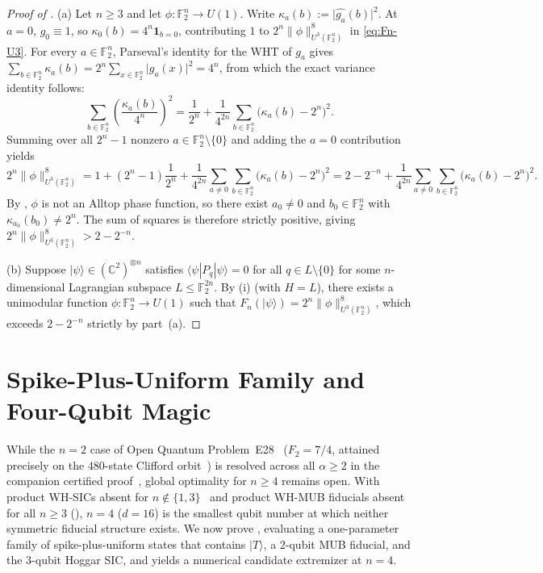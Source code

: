 \documentclass[11pt,a4paper]{article}
\theoremstyle{plain}
\theoremstyle{definition}
\theoremstyle{remark}
\newcommand{\C}{\mathbb{C}}
\newcommand{\F}{\mathbb{F}}
\newcommand{\Uone}{U(1)}
\newcommand{\ket}[1]{|#1\rangle}
\newcommand{\expval}[2]{\langle#1|#2|#1\rangle}
\newcommand{\abs}[1]{\lvert#1\rvert}
\newcommand{\norm}[1]{\lVert#1\rVert}
\newcommand{\indic}[1]{\mathbf{1}_{#1}}
\numberwithin{equation}{section}
\begin{document}
\begin{proof}[Proof of ]
(a) Let $n \ge 3$ and let $\phi : \F_2^n \to \Uone$. Write $\kappa_a(b) := \abs{\widehat{g_a}(b)}^2$. At $a = 0$, $g_0 \equiv 1$, so $\kappa_0(b) = 4^n \indic{b = 0}$, contributing $1$ to $2^n\norm{\phi}_{U^3(\F_2^n)}^8$ in \eqref{eq:Fn-U3}. For every $a \in \F_2^n$, Parseval's identity for the WHT of $g_a$ gives $\sum_{b \in \F_2^n} \kappa_a(b) = 2^n \sum_{x \in \F_2^n} \abs{g_a(x)}^2 = 4^n$, from which the exact variance identity follows:
\[
  \sum_{b \in \F_2^n} \left(\frac{\kappa_a(b)}{4^n}\right)^2
  = \frac{1}{2^n} + \frac{1}{4^{2n}} \sum_{b \in \F_2^n} \bigl(\kappa_a(b) - 2^n\bigr)^2.
\]
Summing over all $2^n - 1$ nonzero $a \in \F_2^n \setminus \{0\}$ and adding the $a = 0$ contribution yields
\[
  2^n \norm{\phi}_{U^3(\F_2^n)}^8
  = 1 + (2^n - 1)\frac{1}{2^n} + \frac{1}{4^{2n}} \sum_{a \neq 0} \sum_{b \in \F_2^n} \bigl(\kappa_a(b) - 2^n\bigr)^2
  = 2 - 2^{-n} + \frac{1}{4^{2n}} \sum_{a \neq 0} \sum_{b \in \F_2^n} \bigl(\kappa_a(b) - 2^n\bigr)^2.
\]
By , $\phi$ is not an Alltop phase function, so there exist $a_0 \neq 0$ and $b_0 \in \F_2^n$ with $\kappa_{a_0}(b_0) \neq 2^n$. The sum of squares is therefore strictly positive, giving $2^n \norm{\phi}_{U^3(\F_2^n)}^8 > 2 - 2^{-n}$.

(b) Suppose $\ket{\psi} \in (\C^2)^{\otimes n}$ satisfies $\expval{\psi}{P_q} = 0$ for all $q \in L \setminus \{0\}$ for some $n$-dimensional Lagrangian subspace $L \le \F_2^{2n}$. By (i) (with $H = L$), there exists a unimodular function $\phi : \F_2^n \to \Uone$ such that $F_n(\ket{\psi}) = 2^n\norm{\phi}_{U^3(\F_2^n)}^8$, which exceeds $2 - 2^{-n}$ strictly by part~(a).
\end{proof}

\section{Spike-Plus-Uniform Family and Four-Qubit Magic}\label{sec:spike}

While the $n = 2$ case of Open Quantum Problem~E28~\cite{oqpE28} ($F_2 = 7/4$, attained precisely on the $480$-state Clifford orbit~\cite{liu2026maximal}) is resolved across all $\alpha \ge 2$ in the companion certified proof~\cite{ye2026twoqubit}, global optimality for $n \ge 4$ remains open. With product WH-SICs absent for $n \notin \{1, 3\}$~\cite{godsil2009equiangular} and product WH-MUB fiducials absent for all $n \ge 3$ (), $n = 4$ ($d = 16$) is the smallest qubit number at which neither symmetric fiducial structure exists. We now prove , evaluating a one-parameter family of spike-plus-uniform states that contains $\ket{T}$, a $2$-qubit MUB fiducial, and the $3$-qubit Hoggar SIC, and yields a numerical candidate extremizer at $n = 4$.
\end{document}
